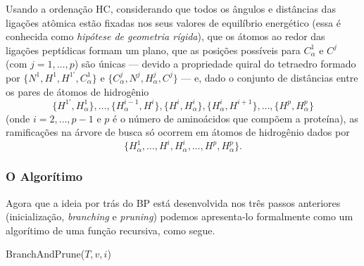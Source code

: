 \begin{teorema}
	Usando a ordenação HC, considerando que todos os ângulos e distâncias das ligações atômica estão fixadas nos seus valores de equilíbrio energético (essa é conhecida como \textit{hipótese de geometria rígida}), que os átomos ao redor das ligações peptídicas formam um plano, que as posições possíveis para $C_\alpha^1$ e $C^j$ (com $j = 1, \dots,p$) são únicas --- devido a propriedade quiral do tetraedro formado por $\{N^1, H^1, H^{1\prime}, C_\alpha^1\}$ e $\{C_\alpha^j, N^j, H^j_\alpha,C^j\}$ --- e, dado o conjunto de distâncias entre os pares de átomos de hidrogênio
	$$\{H^{1\prime}, H^1_\alpha\}, \dots, \{H_\alpha^{i-1}, H^i\}, \{H^i, H^i_\alpha\}, \{H^i_\alpha, H^{i+1}\}, \dots, \{H^p, H^p_\alpha\}$$
	(onde $i = 2, \dots, p-1$ e $p$ é o número de aminoácidos que compõem a proteína), as ramificações na árvore de busca só ocorrem em átomos de hidrogênio dados por
	$$\{H_\alpha^1, \dots, H^i, H_\alpha^i, \dots, H^p, H_\alpha^p\}.$$	
\end{teorema}

\subsubsection{O Algorítimo}
Agora que a ideia por trás do BP está desenvolvida nos três passos anteriores (inicialização, \textit{branching} e \textit{pruning}) podemos apresenta-lo formalmente como um algorítimo de uma função recursiva, como segue.
\\

\begin{algorithm}[H]
	\caption{BranchAndPrune($T,v,i$) \cite{fidalgotese} \cite{carlile:BP}}
\end{algorithm}